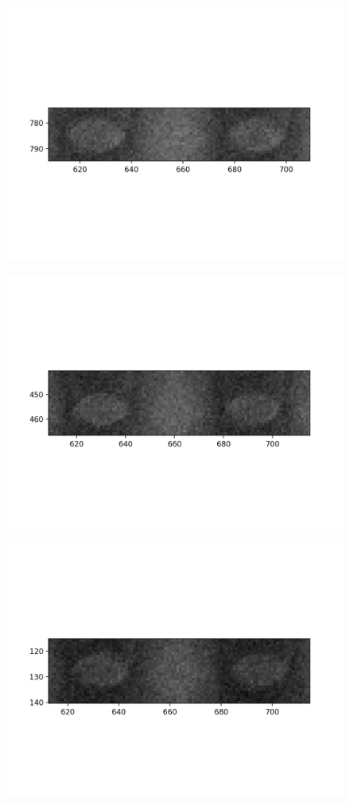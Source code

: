 \documentclass[10pt,a4paper]{article}
\begin{document}
\begin{figure}
	\includegraphics{data/image_stamps/c1}
\end{figure}
\begin{figure}
	\includegraphics{data/image_stamps/c2}
\end{figure}
\begin{figure}
	\includegraphics{data/image_stamps/c3}
\end{figure}
\end{document}

